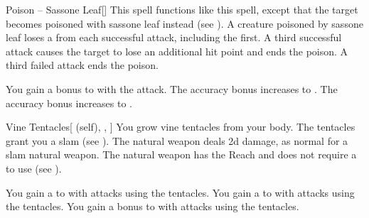\lowercase{\hypertarget{spell:Poison -- Sassone Leaf}{}}\label{spell:Poison -- Sassone Leaf}
\begin{freeability}[Rank 2]{\hypertarget{spell:Poison -- Sassone Leaf}{Poison -- Sassone Leaf}}[]
This spell functions like this  spell, except that the target becomes poisoned with sassone leaf instead (see ).
A creature poisoned by sassone leaf loses a  from each successful attack, including the first.
A third successful attack causes the target to lose an additional hit point and ends the poison.
A third failed attack ends the poison.

\rankline
{} You gain a  bonus to  with the attack.
 The accuracy bonus increases to .
 The accuracy bonus increases to .

\end{freeability}
\vspace{0.25em}



\lowercase{\hypertarget{spell:Vine Tentacles}{}}\label{spell:Vine Tentacles}
\begin{attuneability}[Rank 2]{\hypertarget{spell:Vine Tentacles}{Vine Tentacles}}[ (self), , ]
You grow vine tentacles from your body.
The tentacles grant you a slam  (see ).
The natural weapon deals \plus2d damage, as normal for a slam natural weapon.
The natural weapon has the Reach  and does not require a  to use (see ).

\rankline
{} You gain a   to  with attacks using the tentacles.
 You gain a   to  with attacks using the tentacles.
 You gain a  bonus to  with attacks using the tentacles.

\end{attuneability}
\vspace{0.25em}



